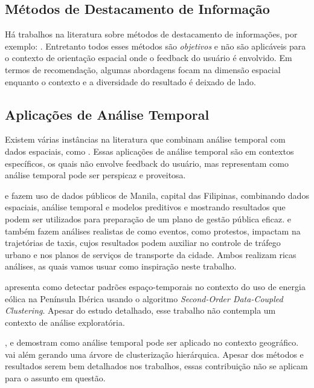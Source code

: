 \subsection{Métodos de Destacamento de Informação}


Há trabalhos na literatura sobre métodos de destacamento de informações, por exemplo: . Entretanto todos esses métodos são {\em objetivos} e não são aplicáveis para o contexto de orientação espacial onde o feedback do usuário é envolvido. Em termos de recomendação, algumas abordagens focam na dimensão espacial \cite{Bao2015,Levandoski:2012} enquanto o contexto e a diversidade do resultado é deixado de lado.

\subsection{Aplicações de Análise Temporal}

Existem várias instâncias na literatura que combinam análise temporal com dados espaciais, como . Essas aplicações de análise temporal são em contextos específicos, os quais não envolve feedback do usuário, mas representam como análise temporal pode ser perspicaz e proveitosa.

 e  fazem uso de dados públicos de Manila, capital das Filipinas, combinando dados espaciais, análise temporal e modelos preditivos e mostrando resultados que podem ser utilizados para preparação de um plano de gestão pública eficaz.  e  também fazem análises realistas de como eventos, como protestos, impactam na trajetórias de taxis, cujos resultados podem auxiliar no controle de tráfego urbano e nos planos de serviços de transporte da cidade. Ambos realizam ricas análises, as quais vamos usuar como inspiração neste trabalho.

 apresenta como detectar padrões espaço-temporais no contexto do uso de energia eólica na Península Ibérica usando o algoritmo {\em Second-Order Data-Coupled Clustering}. Apesar do estudo detalhado, esse trabalho não contempla um contexto de análise exploratória.

,  e  demostram como análise temporal pode ser aplicado no contexto geográfico.  vai além gerando uma árvore de clusterização hierárquica. Apesar dos métodos e resultados serem bem detalhados nos trabalhos, essas contribuição não se aplicam para o assunto em questão.

